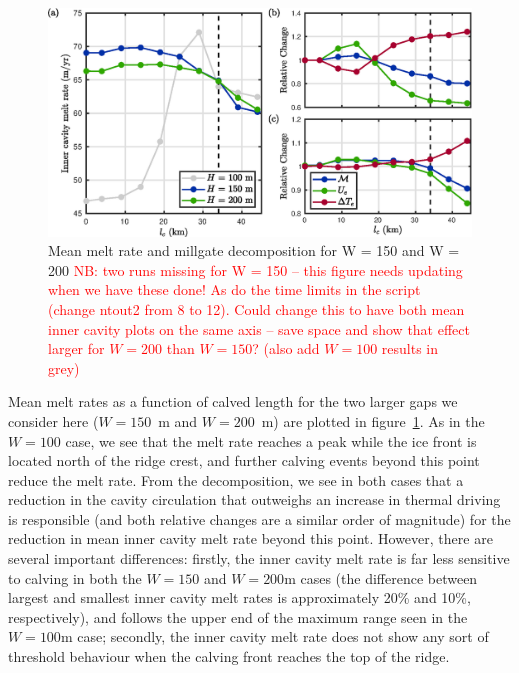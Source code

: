 \documentclass[draft]{agujournal2019}
\newcommand{\red}[1]{\textcolor{red}{#1}}
\begin{document}
\begin{figure}
    \centering
    \includegraphics[width = \textwidth]{../make_figures/plots/figure6.eps}
    \caption{Mean melt rate and millgate decomposition for W = 150 and W = 200 \red{NB: two runs missing for W = 150 -- this figure needs updating when we have these done! As do the time limits in the script (change ntout2 from 8 to 12). Could change this to have both mean inner cavity plots on the same axis -- save space and show that effect larger for $W = 200$ than $W = 150$? (also add $W = 100$ results in grey) }}
    \label{fig:figure6}
\end{figure}

Mean melt rates as a function of calved length for the two larger gaps we consider here ($W = 150$~m and $W = 200$~m) are plotted in figure~\ref{fig:figure6}. As in the $W = 100$ case, we see that the melt rate reaches a peak while the ice front is located north of the ridge crest, and further calving events beyond this point reduce the melt rate. From the decomposition, we see in both cases that a reduction in the cavity circulation that outweighs an increase in thermal driving is responsible (and both relative changes are a similar order of magnitude) for the reduction in mean inner cavity melt rate beyond this point.  However, there are several important differences: firstly, the inner cavity melt rate is far less sensitive to calving in both the $W = 150$ and $W = 200$m cases (the difference between largest and smallest inner cavity melt rates is approximately 20\% and 10\%, respectively), and follows the upper end of the maximum range seen in the $W = 100$m case; secondly, the inner cavity melt rate does not show any sort of threshold behaviour when the calving front reaches the top of the ridge.
\end{document}
